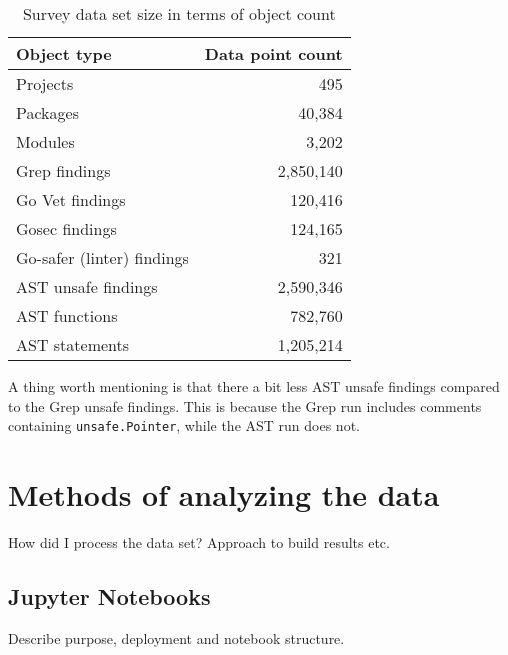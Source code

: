 \begin{table}[h]
    \centering
    \caption{Survey data set size in terms of object count}
    \label{tbl:survey-dataset-size}
    \begin{tabular}{lr}
        \toprule
        Object type & Data point count \\
        \midrule
        Projects & 495 \\
        Packages & 40,384 \\
        Modules & 3,202 \\
        Grep findings & 2,850,140 \\
        Go Vet findings & 120,416 \\
        Gosec findings & 124,165 \\
        Go-safer (linter) findings & 321 \\
        AST unsafe findings & 2,590,346 \\
        AST functions & 782,760 \\
        AST statements & 1,205,214 \\
        \bottomrule
    \end{tabular}
\end{table}

A thing worth mentioning is that there a bit less AST unsafe findings compared to the Grep unsafe findings. This is
because the Grep run includes comments containing \texttt{unsafe.Pointer}, while the AST run does not.



\section{Methods of analyzing the data}\label{sec:survey-analysis-methods}

How did I process the data set?
Approach to build results etc.



\subsection{Jupyter Notebooks}\label{subsec:survey-jupyter}

Describe purpose, deployment and notebook structure.




